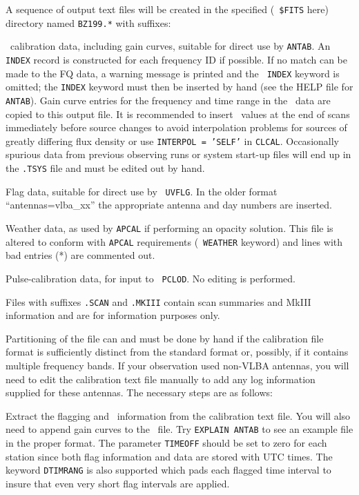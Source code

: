 A sequence of output text files will be created in the specified ({\tt
\$FITS} here) directory named {\tt BZ199.*} with suffixes:

\xben
{} \Tsys\ calibration data, including gain
curves, suitable for direct use by {\tt ANTAB}\@.  An {\tt INDEX}
record is constructed for each frequency ID if possible. If no match
can be made to the FQ data, a warning message is printed and the {\tt
INDEX} keyword is omitted; the {\tt INDEX} keyword must then be
inserted by hand (see the HELP file for {\tt ANTAB}).  Gain curve
entries for the frequency and time range in the \uv\ data are copied
to this output file.  It is recommended to insert \Tsys\ values
at the end of scans immediately before source changes to avoid
interpolation problems for sources of greatly differing flux density
or use {\tt INTERPOL = 'SELF'} in {\tt CLCAL}\@.  Occasionally
spurious data from previous observing runs or system start-up files
will end up in the {\tt .TSYS} file and must be edited out by hand.

 Flag data, suitable for direct use by {\tt
UVFLG}\@. In the older format ``antennas=vlba\_xx'' the appropriate
antenna and day numbers are inserted.

 Weather data, as used by {\tt APCAL} if performing an
opacity solution. This file is altered to conform with {\tt APCAL}
requirements (\eg\ {\tt WEATHER} keyword) and lines with bad entries
(*) are commented out.

 Pulse-calibration data, for input to {\tt
PCLOD}\@. No editing is performed.
\xeen

Files with suffixes {\tt .SCAN} and {\tt .MKIII} contain scan
summaries and MkIII information and are for information purposes only.


Partitioning of the  file can and must be done by
hand if the calibration file format is sufficiently distinct from the
standard  format or, possibly, if it contains multiple
frequency bands.  If your observation used non-VLBA antennas, you will
need to edit the calibration text file manually to add any log
information supplied for these antennas.  The necessary steps are as
follows:

Extract the flagging and \Tsys\  information from the
calibration text file.  You will also need to append gain curves to
the \Tsys\ file.  Try {\tt EXPLAIN ANTAB} to see an example
file in the proper format.  The parameter {\tt TIMEOFF} should be set
to zero for each station since both flag information and data are
stored with UTC times.  The keyword {\tt DTIMRANG} is also supported
which pads each flagged time interval to insure that even very short
flag intervals are applied.

